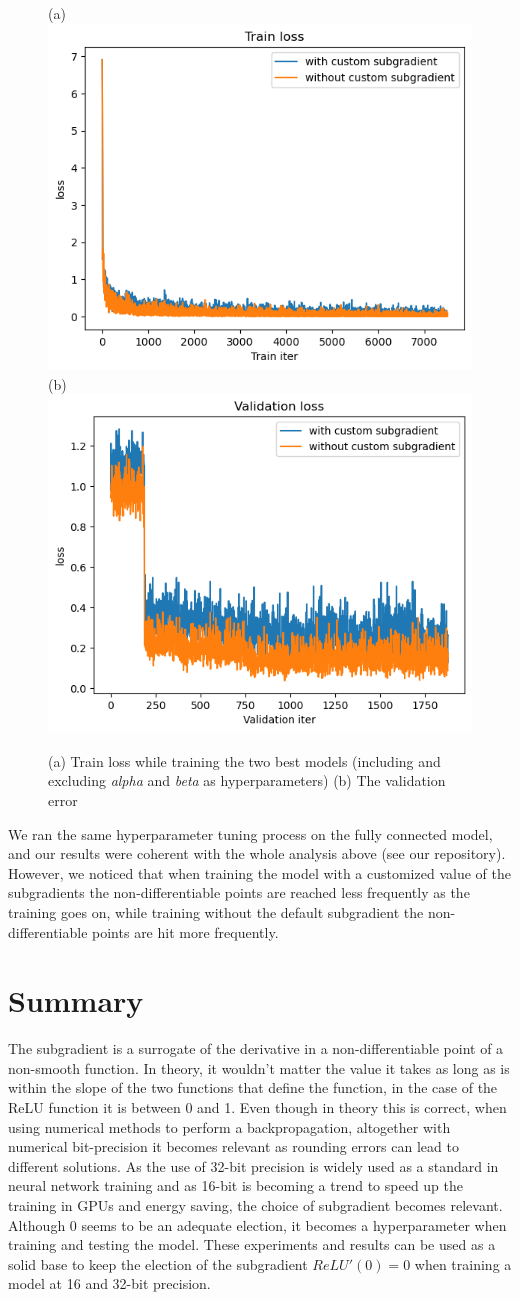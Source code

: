 \begin{figure}[hbtp]
    \centering
        \subfigure(a){\includegraphics[width=0.45\columnwidth]{Images/mobilenet_hyperparameter_tuning_train.png}} 
        \subfigure(b){\includegraphics[width=0.45\columnwidth]{Images/mobilenet_hyperparameter_tuning_val.png}}
    \caption{(a) Train loss while training the two best models (including and excluding \textit{alpha} and \textit{beta} as hyperparameters) (b) The validation error }
\end{figure}

We ran the same hyperparameter tuning process on the fully connected model, and our results were coherent with the whole analysis above (see our repository). However, we noticed that when training the model with a customized value of the subgradients the non-differentiable points are reached less frequently as the training goes on, while training without the default subgradient the non-differentiable points are hit more frequently.

\section{Summary}

The subgradient is a surrogate of the derivative in a non-differentiable point of a non-smooth function. In theory, it wouldn't matter the value it takes as long as is within the slope of the two functions that define the function, in the case of the ReLU function it is between 0 and 1. Even though in theory this is correct, when using numerical methods to perform a backpropagation, altogether with numerical bit-precision it becomes relevant as rounding errors can lead to different solutions. As the use of 32-bit precision is widely used as a standard in neural network training and as 16-bit is becoming a trend to speed up the training in GPUs and energy saving, the choice of subgradient becomes relevant. Although 0 seems to be an adequate election, it becomes a hyperparameter when training and testing the model. These experiments and results can be used as a solid base to keep the election of the subgradient $ReLU'(0)=0$ when training a model at 16 and 32-bit precision.